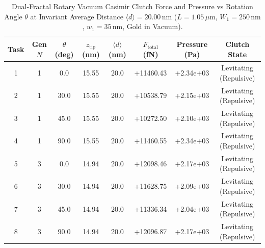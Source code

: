 \begin{table}[htbp]
\centering
\caption{Dual-Fractal Rotary Vacuum Casimir Clutch Force and Pressure vs Rotation Angle $\theta$ at Invariant Average Distance $\langle d \rangle = 20.00\,\text{nm}$ ($L = 1.05\,\mu\text{m}$, $W_1 = 250\,\text{nm}$, $w_1 = 35\,\text{nm}$, Gold in Vacuum).}
\label{tab:fractal_rotary_clutch}
\begin{tabular}{cccccccc}
\hline\hline
Task & Gen $N$ & $\theta$ (deg) & $z_{\text{tip}}$ (nm) & $\langle d \rangle$ (nm) & $F_{\text{total}}$ (fN) & Pressure (Pa) & Clutch State \\
\hline
1 & 1 & 0.0 & 15.55 & 20.0 & +11460.43 & +2.34e+03 & Levitating (Repulsive) \\
2 & 1 & 30.0 & 15.55 & 20.0 & +10538.79 & +2.15e+03 & Levitating (Repulsive) \\
3 & 1 & 45.0 & 15.55 & 20.0 & +10272.50 & +2.10e+03 & Levitating (Repulsive) \\
4 & 1 & 90.0 & 15.55 & 20.0 & +11460.55 & +2.34e+03 & Levitating (Repulsive) \\
5 & 3 & 0.0 & 14.94 & 20.0 & +12098.46 & +2.17e+03 & Levitating (Repulsive) \\
6 & 3 & 30.0 & 14.94 & 20.0 & +11628.75 & +2.09e+03 & Levitating (Repulsive) \\
7 & 3 & 45.0 & 14.94 & 20.0 & +11336.34 & +2.04e+03 & Levitating (Repulsive) \\
8 & 3 & 90.0 & 14.94 & 20.0 & +12096.87 & +2.17e+03 & Levitating (Repulsive) \\
\hline\hline
\end{tabular}
\end{table}
